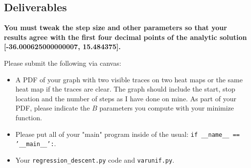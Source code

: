 \begin{fullwidth}
\section{Deliverables}

{\bf You must tweak the step size and other parameters so that your results agree with the first four decimal points of the analytic solution [-36.000625000000007, 15.484375].}

Please submit the following via canvas:
 
\begin{itemize}
\item A PDF of your graph with two visible traces on two heat maps or the same heat map if the traces are clear. The graph should include the start, stop location and the number of steps as I have done on mine. As part of your PDF, please indicate the $B$ parameters you compute with your minimize function.
\item Please put all of your "main" program inside of the usual: {\tt if \_\_name\_\_ == '\_\_main\_\_':}.
\item Your {\tt regression\_descent.py} code and {\tt varunif.py}.
\end{itemize}

\end{fullwidth}

